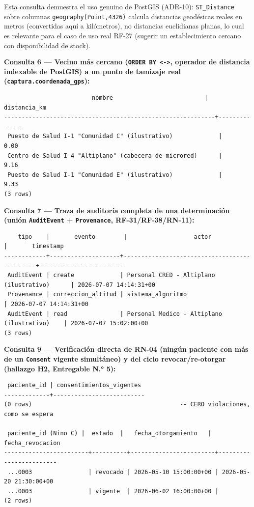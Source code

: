 \documentclass[11pt,a4paper]{article}
\begin{document}
Esta consulta demuestra el uso genuino de PostGIS (ADR-10): \texttt{ST\_Distance} sobre columnas \texttt{geography(Point,4326)} calcula distancias geodésicas reales en metros (convertidas aquí a kilómetros), no distancias euclidianas planas, lo cual es relevante para el caso de uso real RF-27 (sugerir un establecimiento cercano con disponibilidad de stock).

\textbf{Consulta 6 --- Vecino más cercano (\texttt{ORDER\ BY\ \textless{}-\textgreater{}}, operador de distancia indexable de PostGIS) a un punto de tamizaje real (\texttt{captura.coordenada\_gps}):}

\begin{samepage}\begin{verbatim}
                         nombre                          | distancia_km
------------------------------------------------------------+--------------
 Puesto de Salud I-1 "Comunidad C" (ilustrativo)             |         0.00
 Centro de Salud I-4 "Altiplano" (cabecera de microred)      |         9.16
 Puesto de Salud I-1 "Comunidad E" (ilustrativo)             |         9.33
(3 rows)
\end{verbatim}\end{samepage}

\textbf{Consulta 7 --- Traza de auditoría completa de una determinación (unión \texttt{AuditEvent} + \texttt{Provenance}, RF-31/RF-38/RN-11):}

\begin{samepage}\begin{verbatim}
    tipo    |       evento        |                   actor                    |       timestamp
------------+--------------------+---------------------------------------------+------------------------
 AuditEvent | create             | Personal CRED - Altiplano (ilustrativo)      | 2026-07-07 14:14:31+00
 Provenance | correccion_altitud | sistema_algoritmo                            | 2026-07-07 14:14:31+00
 AuditEvent | read               | Personal Medico - Altiplano (ilustrativo)    | 2026-07-07 15:02:00+00
(3 rows)
\end{verbatim}\end{samepage}

\textbf{Consulta 9 --- Verificación directa de RN-04 (ningún paciente con más de un \texttt{Consent} vigente simultáneo) y del ciclo revocar/re-otorgar (hallazgo H2, Entregable N.° 5):}

\begin{samepage}\begin{verbatim}
 paciente_id | consentimientos_vigentes
-------------+--------------------------
(0 rows)                                          -- CERO violaciones, como se espera

 paciente_id (Nino C) |  estado  |   fecha_otorgamiento   |    fecha_revocacion
------------------------+----------+------------------------+------------------------
 ...0003                | revocado | 2026-05-10 15:00:00+00 | 2026-05-20 21:30:00+00
 ...0003                | vigente  | 2026-06-02 16:00:00+00 |
(2 rows)
\end{verbatim}\end{samepage}
\end{document}

